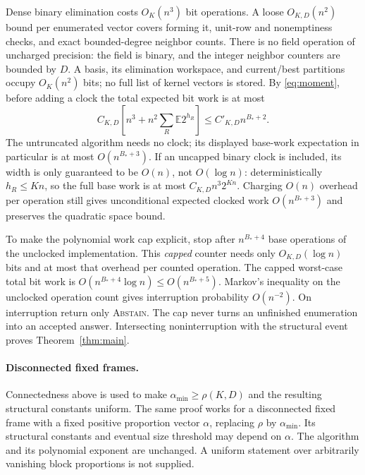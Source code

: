 \documentclass[11pt]{article}
\newcommand{\E}{\mathbb E}
\begin{document}
Dense binary elimination costs $O_K(n^3)$ bit operations. A loose
$O_{K,D}(n^2)$ bound per enumerated vector covers forming it, unit-row
and nonemptiness checks, and exact bounded-degree neighbor counts.
There is no field operation of uncharged precision: the field is binary,
and the integer neighbor counters are bounded by $D$. A basis, its
elimination workspace, and current/best partitions occupy $O_K(n^2)$
bits; no full list of kernel vectors is stored.
By \eqref{eq:moment}, before adding a clock the total expected bit work
is at most
\[
 C_{K,D}\left[n^3+n^2\sum_R\E2^{h_R}\right]
 \le C'_{K,D}n^{B_*+2}.
\]
The untruncated algorithm needs no clock; its displayed base-work
expectation in particular is at most $O(n^{B_*+3})$. If an uncapped
binary clock is included, its width is only guaranteed to be $O(n)$,
not $O(\log n)$: deterministically $h_R\le Kn$, so the full base
work is at most $C_{K,D}n^3 2^{Kn}$. Charging $O(n)$ overhead per
operation still gives unconditional expected clocked work
$O(n^{B_*+3})$ and preserves the quadratic space bound.

To make the polynomial work cap explicit, stop after $n^{B_*+4}$
base operations of the unclocked implementation. This \emph{capped}
counter needs only $O_{K,D}(\log n)$ bits and at most that overhead
per counted operation. The capped worst-case total bit work is
$O(n^{B_*+4}\log n)\le O(n^{B_*+5})$.
Markov's inequality on the unclocked operation count gives interruption
probability $O(n^{-2})$. On interruption return only \textsc{Abstain}.
The cap never turns an unfinished enumeration into an accepted answer.
Intersecting noninterruption with the structural event proves
Theorem~\ref{thm:main}.

\paragraph{Disconnected fixed frames.}
Connectedness above is used to make $\alpha_{\min}\ge\rho(K,D)$ and
the resulting structural constants uniform. The same proof works for
a disconnected fixed frame with a fixed positive proportion vector
$\alpha$, replacing $\rho$ by $\alpha_{\min}$. Its structural constants
and eventual size threshold may depend on $\alpha$. The algorithm and
its polynomial exponent are unchanged. A uniform statement over
arbitrarily vanishing block proportions is not supplied.
\end{document}
